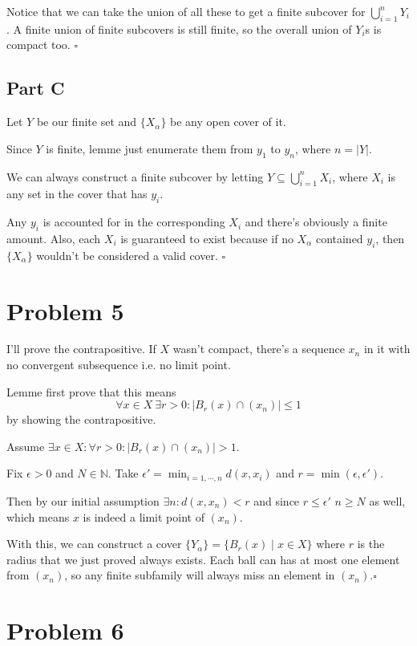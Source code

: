 \documentclass[12pt]{article}
\newcommand{\N}{\mathbb{N}}
\begin{document}
Notice that we can take the union of all these to get a finite subcover for $\bigcup_{i=1}^n Y_i$.
A finite union of finite subcovers is still finite,
so the overall union of $Y_i$s is compact too. $\square$

\subsection{Part C}

Let $Y$ be our finite set and $\{X_\alpha\}$ be any open cover of it.

Since $Y$ is finite, lemme just enumerate them from $y_1$ to $y_n$, where $n=|Y|$.

We can always construct a finite subcover by letting
$Y \subseteq \bigcup_{i=1}^n X_i$, where $X_i$ is any set in the cover that has $y_i$.

Any $y_i$ is accounted for in the corresponding $X_i$ and there's obviously a finite amount.
Also, each $X_i$ is guaranteed to exist because if no $X_\alpha$ contained $y_i$,
then $\{X_\alpha\}$ wouldn't be considered a valid cover. $\square$

\pagebreak

\section{Problem 5}

I'll prove the contrapositive.
If $X$ wasn't compact, there's a sequence $x_n$ in it with no convergent subsequence i.e. no limit point.

Lemme first prove that this means
\[\forall x \in X\ \exists r > 0: |B_r(x) \cap (x_n)| \le 1\]
by showing the contrapositive.

Assume $\exists x \in X: \forall r > 0: |B_r(x) \cap (x_n)| > 1$.

Fix $\epsilon > 0$ and $N \in \N$.
Take $\epsilon' = \min_{i=1, \cdots, n} d(x, x_i)$ and $r=\min(\epsilon, \epsilon')$.

Then by our initial assumption $\exists n: d(x, x_n) < r$ and since $r \le \epsilon'$ $n \ge N$ as well,
which means $x$ is indeed a limit point of $(x_n)$.

With this, we can construct a cover $\{Y_\alpha\} = \{B_r(x) \mid x \in X\}$ where $r$
is the radius that we just proved always exists.
Each ball can has at most one element from $(x_n)$,
so any finite subfamily will always miss an element in $(x_n)$.$\square$

\section{Problem 6}
\end{document}
